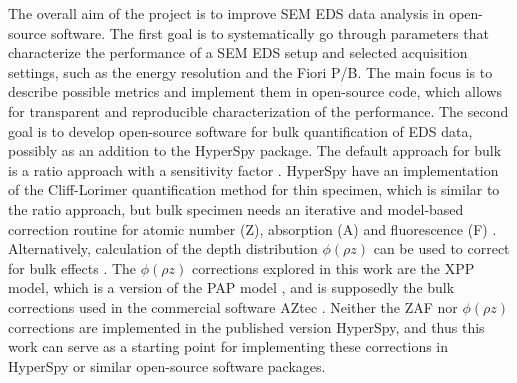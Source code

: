 The overall aim of the project is to improve SEM EDS data analysis in open-source software.
The first goal is to systematically go through parameters that characterize the performance of a SEM EDS setup and selected acquisition settings, such as the energy resolution and the Fiori P/B.
The main focus is to describe possible metrics and implement them in open-source code, which allows for transparent and reproducible characterization of the performance.
The second goal is to develop open-source software for bulk quantification of EDS data, possibly as an addition to the HyperSpy package.
The default approach for bulk is a ratio approach with a sensitivity factor \cite{goldstein_scanning_2018}.
HyperSpy have an implementation of the Cliff-Lorimer quantification method for thin specimen, which is similar to the ratio approach, but bulk specimen needs an iterative and model-based correction routine for atomic number (Z), absorption (A) and fluorescence (F) \cite{goldstein_scanning_2018}.
Alternatively, calculation of the depth distribution $\phi (\rho z)$ can be used to correct for bulk effects \cite{goldstein_scanning_2018,pap_1991}.
The $\phi (\rho z)$ corrections explored in this work are the XPP model, which is a version of the PAP model \cite{pap_1991}, and is supposedly the bulk corrections used in the commercial software AZtec \cite{oxford_blog_XPP,aztec_manual}.
Neither the ZAF nor $\phi (\rho z)$ corrections are implemented in the published version HyperSpy, and thus this work can serve as a starting point for implementing these corrections in HyperSpy or similar open-source software packages.




